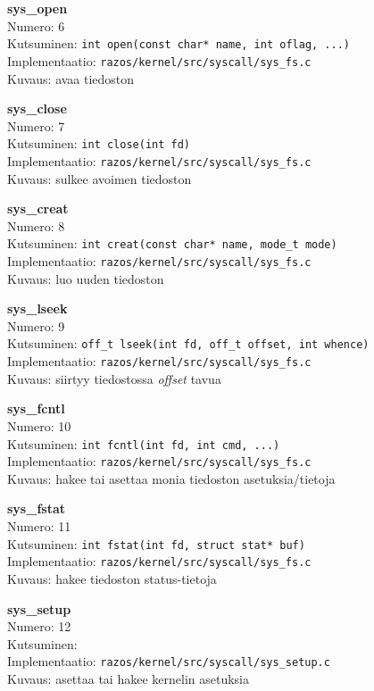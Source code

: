 \textbf{sys\_open}\\
Numero: 6\\
Kutsuminen: \texttt{int open(const char* name, int oflag, ...)}\\
Implementaatio: \texttt{razos/kernel/src/syscall/sys\_fs.c}\\
Kuvaus: avaa tiedoston

\textbf{sys\_close}\\
Numero: 7\\
Kutsuminen: \texttt{int close(int fd)}\\
Implementaatio: \texttt{razos/kernel/src/syscall/sys\_fs.c}\\
Kuvaus: sulkee avoimen tiedoston

\textbf{sys\_creat}\\
Numero: 8\\
Kutsuminen: \texttt{int creat(const char* name, mode\_t mode)}\\
Implementaatio: \texttt{razos/kernel/src/syscall/sys\_fs.c}\\
Kuvaus: luo uuden tiedoston

\textbf{sys\_lseek}\\
Numero: 9\\
Kutsuminen: \texttt{off\_t lseek(int fd, off\_t offset, int whence)}\\
Implementaatio: \texttt{razos/kernel/src/syscall/sys\_fs.c}\\
Kuvaus: siirtyy tiedostossa \textit{offset} tavua

\textbf{sys\_fcntl}\\
Numero: 10\\
Kutsuminen: \texttt{int fcntl(int fd, int cmd, ...)}\\
Implementaatio: \texttt{razos/kernel/src/syscall/sys\_fs.c}\\
Kuvaus: hakee tai asettaa monia tiedoston asetuksia/tietoja

\textbf{sys\_fstat}\\
Numero: 11\\
Kutsuminen: \texttt{int fstat(int fd, struct stat* buf)}\\
Implementaatio: \texttt{razos/kernel/src/syscall/sys\_fs.c}\\
Kuvaus: hakee tiedoston status-tietoja

\textbf{sys\_setup}\\
Numero: 12\\
Kutsuminen: \texttt{}\\
Implementaatio: \texttt{razos/kernel/src/syscall/sys\_setup.c}\\
Kuvaus: asettaa tai hakee kernelin asetuksia

